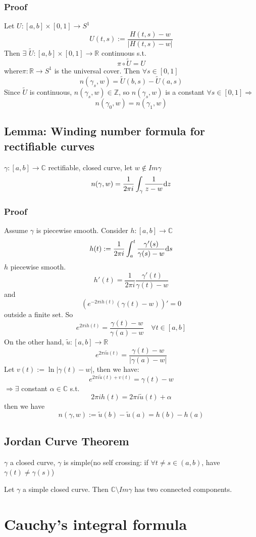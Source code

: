 \documentclass{book}
\newcommand{\abs}[1]{\left\lvert #1 \right\rvert}
\begin{document}
\subsection*{Proof}Let $U:[a,b]\times[0,1]\to S^1$$$U(t,s):=\frac{H(t,s)-w}{\abs{H(t,s)-w}}$$
Then $\exists$ $\tilde U:[a,b]\times[0,1]\to \mathbb R$ continuous s.t.$$\pi\circ\tilde U=U$$where$\pi:\mathbb R\to S^1$ is the universal cover. Then $\forall s\in [0,1]$$$n(\gamma_s,w)=\tilde U(b,s)-\tilde U(a,s)$$
Since $\tilde U$ is continuous, $n(\gamma_s,w)\in \mathbb Z$, so $n(\gamma_s,w)$ is a constant $\forall s\in [0,1]$$\Rightarrow$$$n(\gamma_0,w)=n(\gamma_1,w)$$
\section{Lemma: Winding number formula for rectifiable curves}
$\gamma:[a,b]\to \mathbb C$ rectifiable, closed curve, let $w\notin Im\gamma$$$n(\gamma,w)=\frac{1}{2\pi i}\int_\gamma\frac{1}{z-w}\text dz$$
\subsection*{Proof}
Assume $\gamma$ is piecewise smooth. Consider $h:[a,b]\to\mathbb C$$$h(t):=\frac{1}{2\pi i}\int_a^t\frac{\gamma'(s)}{\gamma(s)-w}\text ds$$ $h$ piecewise smooth.$$h'(t)=\frac{1}{2\pi i}\frac{\gamma'(t)}{\gamma(t)-w}$$
and $$\left(e^{-2\pi ih(t)}(\gamma(t)-w)\right)'=0$$ outside a finite set. So$$e^{2\pi ih(t)}=\frac{\gamma(t)-w}{\gamma(a)-w}\quad\forall t\in [a,b]$$
On the other hand, $\tilde u:[a,b]\to\mathbb R$$$e^{2\pi i\tilde u(t)}=\frac{\gamma(t)-w}{\abs{\gamma(a)-w}}$$
Let $v(t):=\ln\abs{\gamma(t)-w}$, then we have:
$$e^{2\pi i\tilde u(t)+v(t)}=\gamma(t)-w$$$\Rightarrow$$\exists$ constant $\alpha\in \mathbb C$ s.t.$$2\pi i h(t)=2\pi i\tilde u(t)+\alpha$$then we have$$n(\gamma,w):=\tilde u(b)-\tilde u(a)=h(b)-h(a)$$
\section{Jordan Curve Theorem}
$\gamma$ a closed curve, $\gamma$ is simple(no self crossing: if $\forall t\neq s\in (a,b)$, have $\gamma(t)\neq \gamma(s)$)

Let $\gamma$ a simple closed curve. Then $\mathbb C\setminus Im\gamma$ has two connected components.


\chapter{Cauchy's integral formula}
\end{document}
